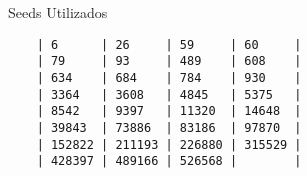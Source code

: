 \begin{table}[ht]
    \centering
    \caption{Seeds Utilizados}
    \begin{verbatim}
    | 6      | 26     | 59     | 60     |
    | 79     | 93     | 489    | 608    |
    | 634    | 684    | 784    | 930    |
    | 3364   | 3608   | 4845   | 5375   |
    | 8542   | 9397   | 11320  | 14648  |
    | 39843  | 73886  | 83186  | 97870  |
    | 152822 | 211193 | 226880 | 315529 |
    | 428397 | 489166 | 526568 |        |
    \end{verbatim}
\end{table}
